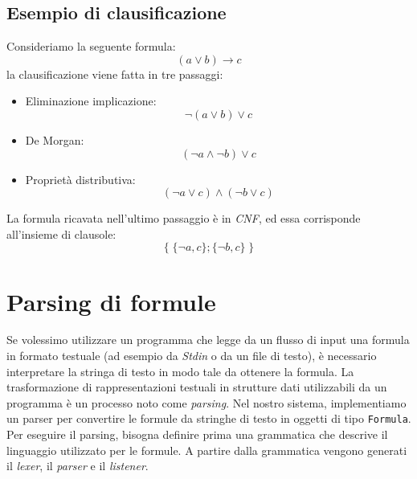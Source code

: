 \documentclass[a4paper,12pt]{report}
\begin{document}
\subsection{Esempio di clausificazione}
Consideriamo la seguente formula:
\[ (a \lor b) \to c \]
la clausificazione viene fatta in tre passaggi:

\begin{itemize}
    \item Eliminazione implicazione:
    \[ \lnot (a \lor b) \lor c \]
    \item De Morgan:
    \[ (\lnot a \land \lnot b) \lor c \]
    \item Proprietà distributiva:
    \[ (\lnot a \lor c) \land (\lnot b \lor c) \]
\end{itemize}

La formula ricavata nell'ultimo passaggio è in \emph{CNF}, ed essa corrisponde all'insieme di clausole:
\[ \{ \; \{\lnot a, c\}; \{\lnot b, c\} \; \} \]

\section{Parsing di formule}
\label{parsing}
Se volessimo utilizzare un programma che legge da un flusso di input una formula in formato testuale (ad esempio da \emph{Stdin} o da un file di testo), è necessario interpretare la stringa di testo in modo tale da ottenere la formula. La trasformazione di rappresentazioni testuali in strutture dati utilizzabili da un programma è un processo noto come \emph{parsing}. Nel nostro sistema, implementiamo un parser per convertire le formule da stringhe di testo in oggetti di tipo \texttt{Formula}. Per eseguire il parsing, bisogna definire prima una grammatica che descrive il linguaggio utilizzato per le formule. A partire dalla grammatica vengono generati il \emph{lexer}, il \emph{parser} e il \emph{listener}.
\end{document}
